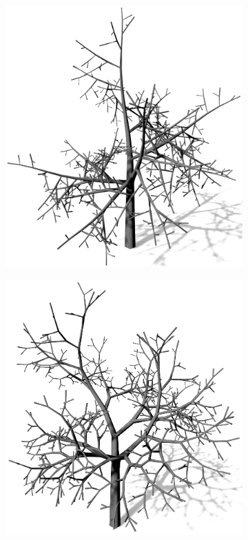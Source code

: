 \begin{figure} [hbtp]
	\centering
	\begin{subfigure}[t]{.45\textwidth}
		\centering
		\includegraphics[width=\linewidth]{images/LS_Sympodial_1.png}
		\caption{}
		\label{subfig:LS_Sympodial_1}
	\end{subfigure}
	\begin{subfigure}[t]{.45\textwidth}
		\centering
		\includegraphics[width=\linewidth]{images/LS_Sympodial_2.png}

\end{subfigure}
\end{figure}
